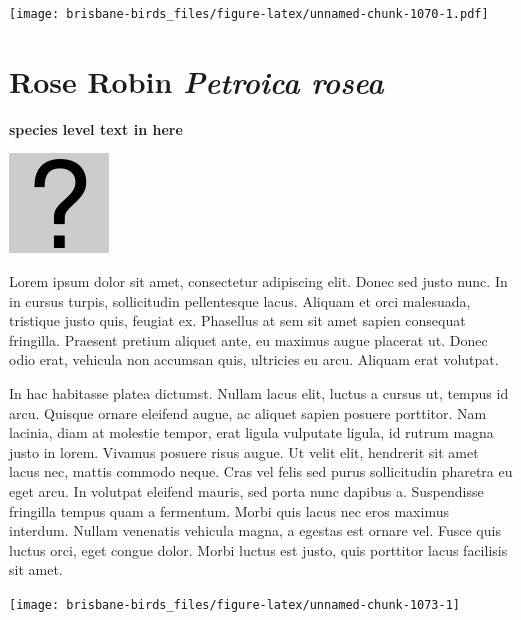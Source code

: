 \documentclass[]{book}
\let\origfigure\figure
\let\endorigfigure\endfigure
\renewenvironment{figure}[1][2] {
  \expandafter\origfigure\expandafter[H]
} {
  \endorigfigure
}
\begin{document}
\begin{figure}
\centering
\texttt{[image: brisbane-birds\_files/figure-latex/unnamed-chunk-1070-1.pdf]}
\caption{\label{fig:unnamed-chunk-1070}insert figure caption}
\end{figure}

\section{\texorpdfstring{Rose Robin \emph{Petroica
rosea}}{Rose Robin Petroica rosea}}\label{rose-robin-petroica-rosea}

\textbf{species level text in here}

\begin{figure}
\centering
\includegraphics{assets/missing.png}
\caption{No image for species}
\end{figure}

Lorem ipsum dolor sit amet, consectetur adipiscing elit. Donec sed justo
nunc. In in cursus turpis, sollicitudin pellentesque lacus. Aliquam et
orci malesuada, tristique justo quis, feugiat ex. Phasellus at sem sit
amet sapien consequat fringilla. Praesent pretium aliquet ante, eu
maximus augue placerat ut. Donec odio erat, vehicula non accumsan quis,
ultricies eu arcu. Aliquam erat volutpat.

In hac habitasse platea dictumst. Nullam lacus elit, luctus a cursus ut,
tempus id arcu. Quisque ornare eleifend augue, ac aliquet sapien posuere
porttitor. Nam lacinia, diam at molestie tempor, erat ligula vulputate
ligula, id rutrum magna justo in lorem. Vivamus posuere risus augue. Ut
velit elit, hendrerit sit amet lacus nec, mattis commodo neque. Cras vel
felis sed purus sollicitudin pharetra eu eget arcu. In volutpat eleifend
mauris, sed porta nunc dapibus a. Suspendisse fringilla tempus quam a
fermentum. Morbi quis lacus nec eros maximus interdum. Nullam venenatis
vehicula magna, a egestas est ornare vel. Fusce quis luctus orci, eget
congue dolor. Morbi luctus est justo, quis porttitor lacus facilisis sit
amet.

\begin{figure}
\texttt{[image: brisbane-birds\_files/figure-latex/unnamed-chunk-1073-1]} \caption{insert figure caption}\label{fig:unnamed-chunk-1073}
\end{figure}
\end{document}
